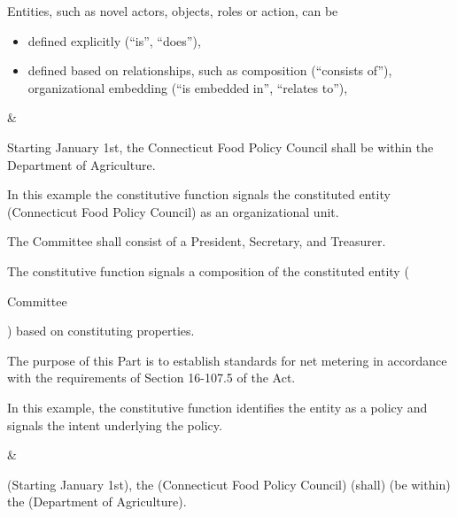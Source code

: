 \begin{landscape}
\begin{longtable}{\tabledims}
\sp

Entities, such as novel actors, objects, roles or action, can be 
\begin{itemize}
\item defined explicitly (``is'', ``does''), 
\item defined based on relationships, such as composition (``consists of''), organizational embedding (``is embedded in'', ``relates to''), 
\end{itemize}

&


\begin{exi}
Starting January 1st, the Connecticut Food Policy Council shall be within the Department of Agriculture.
\end{exi}

\sp

In this example the constitutive function signals the constituted entity (Connecticut Food Policy Council) as an organizational unit.

\sp


\begin{exi}
The Committee shall consist of a President, Secretary, and Treasurer.
\end{exi}

\sp

The constitutive function signals a composition of the constituted entity (\begin{exi}Committee\end{exi}) based on constituting properties. 

\sp


\begin{exi}The purpose of this Part is to establish standards for net metering in accordance with the requirements of Section 16-107.5 of the Act.\end{exi}

\sp

In this example, the constitutive function identifies the entity as a policy and signals the intent underlying the policy. 

&

\vspace{0.03cm}

\begin{exi}
\Cacconst{}(Starting January 1st), the \E{}(Connecticut Food Policy Council) \M{}(shall) \F{}(be within) the \Cexconst{}(Department of Agriculture).\end{exi}


\end{longtable}
\end{landscape}
